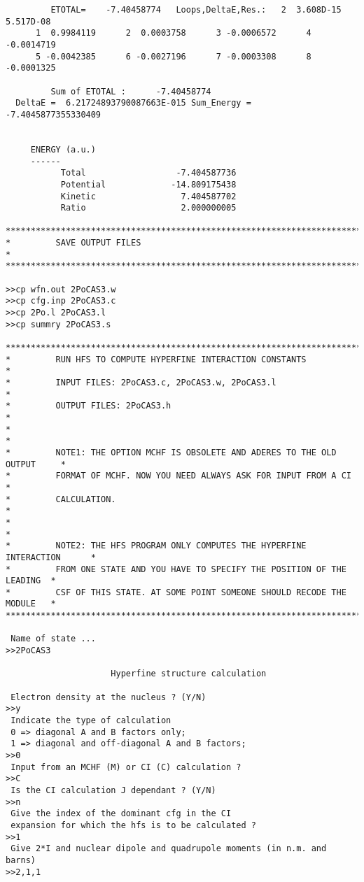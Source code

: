 \documentclass[fleqn,10pt]{book}
\begin{document}
\begin{verbatim}
         ETOTAL=    -7.40458774   Loops,DeltaE,Res.:   2  3.608D-15  5.517D-08
      1  0.9984119      2  0.0003758      3 -0.0006572      4 -0.0014719
      5 -0.0042385      6 -0.0027196      7 -0.0003308      8 -0.0001325

         Sum of ETOTAL :      -7.40458774
  DeltaE =  6.21724893790087663E-015 Sum_Energy =   -7.4045877355330409     


     ENERGY (a.u.)
     ------
           Total                  -7.404587736
           Potential             -14.809175438
           Kinetic                 7.404587702
           Ratio                   2.000000005

*******************************************************************************
*         SAVE OUTPUT FILES                                                   * 
*******************************************************************************

>>cp wfn.out 2PoCAS3.w
>>cp cfg.inp 2PoCAS3.c
>>cp 2Po.l 2PoCAS3.l
>>cp summry 2PoCAS3.s

*******************************************************************************
*         RUN HFS TO COMPUTE HYPERFINE INTERACTION CONSTANTS                  *
*         INPUT FILES: 2PoCAS3.c, 2PoCAS3.w, 2PoCAS3.l                        *
*         OUTPUT FILES: 2PoCAS3.h                                             *  
*                                                                             *
*         NOTE1: THE OPTION MCHF IS OBSOLETE AND ADERES TO THE OLD OUTPUT     *
*         FORMAT OF MCHF. NOW YOU NEED ALWAYS ASK FOR INPUT FROM A CI         *
*         CALCULATION.                                                        *
*                                                                             *
*         NOTE2: THE HFS PROGRAM ONLY COMPUTES THE HYPERFINE INTERACTION      *
*         FROM ONE STATE AND YOU HAVE TO SPECIFY THE POSITION OF THE LEADING  *
*         CSF OF THIS STATE. AT SOME POINT SOMEONE SHOULD RECODE THE MODULE   * 
*******************************************************************************

 Name of state ...
>>2PoCAS3

                     Hyperfine structure calculation

 Electron density at the nucleus ? (Y/N)
>>y
 Indicate the type of calculation
 0 => diagonal A and B factors only;
 1 => diagonal and off-diagonal A and B factors;
>>0
 Input from an MCHF (M) or CI (C) calculation ?
>>C
 Is the CI calculation J dependant ? (Y/N)
>>n
 Give the index of the dominant cfg in the CI
 expansion for which the hfs is to be calculated ?
>>1
 Give 2*I and nuclear dipole and quadrupole moments (in n.m. and barns)
>>2,1,1


\end{verbatim}
\end{document}
